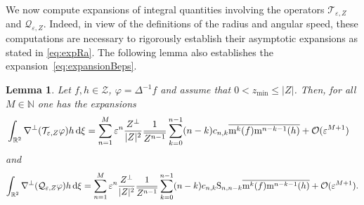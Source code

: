 \documentclass[11pt,reqno,a4paper]{amsart}
\def\dd{{\rm d}}
\def\eps{\varepsilon}
\def\RR {\mathbb{R}}
\newcommand{\cO}{\mathcal{O}}
\newcommand{\cQ}{\mathcal{Q}}
\newcommand{\cT}{\mathcal{T}}
\newcommand{\cZ}{\mathcal{Z}}
\newcommand{\mrm}{\mathrm{m}}
\newcommand{\1}{\mathbbm{1}}
\newtheorem{lemma}[proposition]{Lemma}
\theoremstyle{definition}
\theoremstyle{definition}
\numberwithin{equation}{section}
\begin{document}
We now compute expansions of integral quantities involving the operators $\cT_{\eps,Z}$ and $\cQ_{\eps,Z}$. Indeed, in view of the definitions of the radius and angular speed, these computations are necessary to rigorously establish their asymptotic expansions as stated in \cref{eq:expRa}. The following lemma also establishes the expansion~\cref{eq:expansionBeps}.
\begin{lemma}
\label{lem:expVel}
    Let $f,h\in \cZ$, $\varphi=\Delta^{-1}f$ and assume that $0<z_{\min}\leq |Z|$. Then, for all $M\in \mathbb{N}$ one has the expansions
    \begin{align}
\label{eq:expspeed}&\int_{\RR^2}\nabla^\perp(\cT_{\eps,Z}\varphi)h\,\dd \xi=\sum_{n=1}^M\eps^n\frac{Z^\perp}{|Z|^{2}}\frac{1}{\overline{Z^{n-1}}}\sum_{k=0}^{n-1}(n-k)c_{n,k}\overline{\mrm^k(f)}\overline{\mrm^{n-k-1}(h)}+\cO(\eps^{M+1})    \end{align}
and
\begin{equation}
    \int_{\RR^2}\nabla^\perp(\cQ_{\eps,Z}\varphi)h\,\dd \xi=\sum_{n=1}^M\eps^n\frac{Z^\perp}{|Z|^{2}}\frac{1}{\overline{Z^{n-1}}}\sum_{k=0}^{n-1}(n-k)c_{n,k}{\rm S}_{n,n-k}\overline{\mrm^k(f)}\overline{\mrm^{n-k-1}(h)}+\cO(\eps^{M+1}) .
\end{equation}
\end{lemma}
\end{document}
